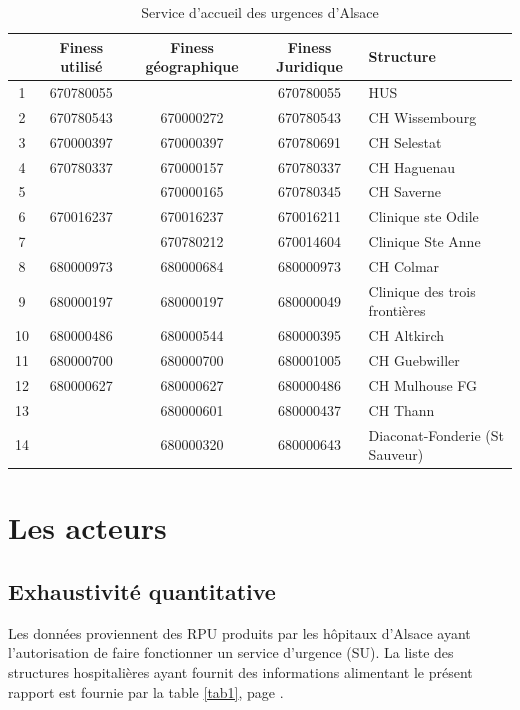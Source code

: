 \documentclass[12pt,english,french,twoside]{report}\usepackage[]{graphicx}\usepackage[]{color}
\begin{document}
\begin{table}
\begin{center}
\begin{tabular}{|c|c|c|c|l|}
  \hline
& Finess utilisé & Finess géographique & Finess Juridique & Structure \\
  \hline
  \hline
1 & 670780055 &   & 670780055 & HUS \\
2 & 670780543 & 670000272 & 670780543 & CH Wissembourg \\
3 & 670000397 & 670000397  & 670780691 & CH Selestat \\
4 & 670780337 & 670000157 & 670780337 & CH Haguenau \\
5 &   & 670000165 & 670780345 & CH Saverne \\
6 & 670016237  & 670016237  & 670016211 & Clinique ste Odile \\
7 &   & 670780212 & 670014604 & Clinique Ste Anne \\
8 & 680000973 & 680000684 & 680000973 & CH Colmar \\
9 & 680000197  & 680000197  & 680000049 & Clinique des trois frontières \\
10 & 680000486 & 680000544  & 680000395 & CH Altkirch \\
11 & 680000700 & 680000700 & 680001005 & CH Guebwiller \\
12 & 680000627 & 680000627 & 680000486 & CH Mulhouse FG \\
13 &   & 680000601 & 680000437 & CH Thann \\
14 &   & 680000320  & 680000643 & Diaconat-Fonderie (St Sauveur) \\
\hline
\end{tabular}
\caption{Service d'accueil des urgences d'Alsace}
\label{summary}
\end{center}
\end{table}

\chapter{Les acteurs}



\section{Exhaustivité quantitative}



Les données proviennent des RPU produits par les hôpitaux d'Alsace ayant l'autorisation de faire fonctionner un service d'urgence (SU). La liste des structures hospitalières ayant fournit des informations alimentant le présent rapport est fournie par la table \ref{tab1}, page \pageref{tab1}.
\end{document}
